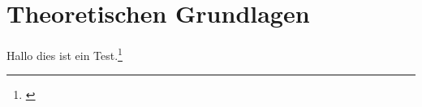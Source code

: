 \section{Theoretischen Grundlagen}
\label{sec:Theorie}
\blindtext
Hallo dies ist ein Test.\footnote{\cite[S.~428]{Reim.2015}}
\blindtext